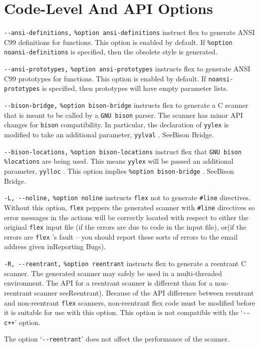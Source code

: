 \documentclass[openany,oneside]{book}
\begin{document}
\section{Code-Level And API Options}
\verb`--ansi-definitions,` \verb`%option ansi-definitions` instruct flex to generate ANSI C99 definitions for functions. 
This option is enabled by default. 
If \verb`%option noansi-definitions` is specified, then the obsolete style
is generated.

\verb`--ansi-prototypes,` \verb`%option ansi-prototypes` instructs flex to generate ANSI C99 prototypes for functions. 
This option is enabled by default. 
If \verb`noansi-prototypes` is specified, then
prototypes will have empty parameter lists.

\verb`--bison-bridge,` \verb`%option bison-bridge` instructs flex to generate a C scanner that is
meant to be called by a \verb`GNU bison` parser. The scanner has minor API changes for \verb`bison` compatibility. In particular, the declaration of \verb`yylex` is modified to take an additional parameter, \verb`yylval` . 
SeeBison Bridge.

\verb`--bison-locations,` \verb`%option bison-locations` instruct flex that \verb`GNU bison`  \verb`%locations` are being used. 
This means \verb`yylex` will be passed
an additional parameter, \verb`yylloc` . This option
implies \verb`%option bison-bridge` . 
SeeBison Bridge.

\verb`-L, --noline,` \verb`%option noline` instructs \verb`flex` not to generate \verb`#line` directives.  Without this option, \verb`flex` peppers the generated scanner
with \verb`#line` directives so error messages in the actions will be correctly
located with respect to either the original \verb`flex` input file (if the errors are due to code in the input file), or(if the errors are \verb`flex` 's
fault – you should report these sorts of errors to the email address
given inReporting Bugs).

\verb`-R, --reentrant,` \verb`%option reentrant` instructs flex to generate a reentrant C scanner.  The generated scanner
may safely be used in a multi-threaded environment. The API for a
reentrant scanner is different than for a non-reentrant scanner
seeReentrant).  Because of the API difference between
reentrant and non-reentrant \verb`flex` scanners, non-reentrant flex
code must be modified before it is suitable for use with this option. 
This option is not compatible with the ‘\verb`--c++`’ option.

The option ‘\verb`--reentrant`’ does not affect the performance of
the scanner.
\end{document}
